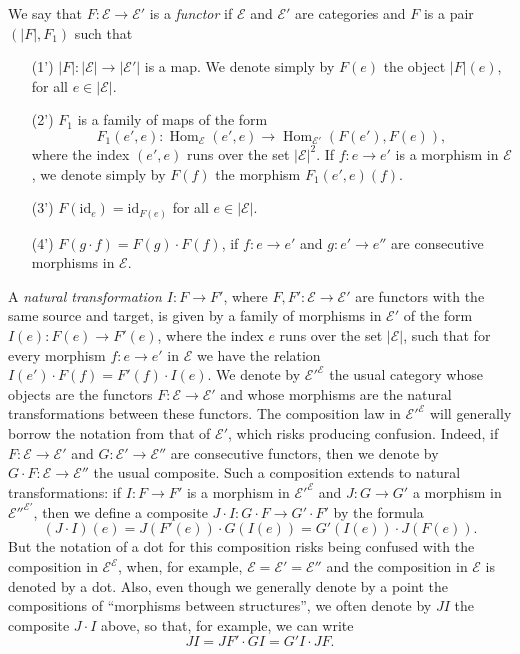 \documentclass{article}
\newcommand{\oldpage}[1]{\marginpar{\footnotesize$\Big\vert$ \textit{p.~#1}}}
\newcommand{\id}{\mathrm{id}}
\newcommand{\cat}[1]{\mathcal{#1}}
\newcommand{\set}[1]{|#1|}
\DeclareMathOperator{\Hom}{Hom}
\begin{document}
We say that $F\colon\cat{E}\to\cat{E}'$ is a \emph{functor} if $\cat{E}$ and $\cat{E}'$ are categories and $F$ is a pair $(\set{F},F_1)$ such that

\begin{enumerate}
  \item[(1')] $\set{F}\colon\set{\cat{E}}\to\set{\cat{E}'}$ is a map.
    We denote simply by $F(e)$ the object $\set{F}(e)$, for all $e\in\set{\cat{E}}$.

  \item[(2')] $F_1$ is a family of maps of the form
    \[
      F_1(e',e)\colon
      \Hom_\cat{E}(e',e)
      \to \Hom_{\cat{E}'}(F(e'),F(e)),
    \]
    where the index $(e',e)$ runs over the set $\set{\cat{E}}^2$.
    If $f\colon e\to e'$ is a morphism in $\cat{E}$, we denote simply by $F(f)$ the morphism $F_1(e',e)(f)$.

  \item[(3')] $F(\id_e)=\id_{F(e)}$ for all $e\in\set{\cat{E}}$.

  \item[(4')] $F(g\cdot f)=F(g)\cdot F(f)$, if $f\colon e\to e'$ and $g\colon e'\to e''$ are consecutive morphisms in $\cat{E}$.
\end{enumerate}

A \emph{natural transformation $I\colon F\to F'$}, where $F,F'\colon\cat{E}\to\cat{E}'$ are functors with the same source and target, is given by a family of morphisms in $\cat{E}'$ of the form $I(e)\colon F(e)\to F'(e)$, where the index $e$ runs over the set $\set{\cat{E}}$, such that for every morphism $f\colon e\to e'$ in $\cat{E}$ we have the relation $I(e')\cdot F(f)=F'(f)\cdot I(e)$.
\oldpage{221}
We denote by $\cat{E}'^{\cat{E}}$ the usual category whose objects are the functors $F\colon\cat{E}\to\cat{E}'$ and whose morphisms are the natural transformations between these functors.
The composition law in $\cat{E}'^{\cat{E}}$ will generally borrow the notation from that of $\cat{E}'$, which risks producing confusion.
Indeed, if $F\colon\cat{E}\to\cat{E}'$ and $G\colon\cat{E}'\to\cat{E}''$ are consecutive functors, then we denote by $G\cdot F\colon\cat{E}\to\cat{E}''$ the usual composite.
Such a composition extends to natural transformations: if $I\colon F\to F'$ is a morphism in $\cat{E}'^{\cat{E}}$ and $J\colon G\to G'$ a morphism in $\cat{E}''^{\cat{E}'}$, then we define a composite $J\cdot I\colon G\cdot F\to G'\cdot F'$ by the formula
\[
  (J\cdot I)(e)
  = J(F'(e))\cdot G(I(e))
  = G'(I(e))\cdot J(F(e)).
\]
But the notation of a dot for this composition risks being confused with the composition in $\cat{E}^\cat{E}$, when, for example, $\cat{E}=\cat{E}'=\cat{E}''$ and the composition in $\cat{E}$ is denoted by a dot.
Also, even though we generally denote by a point the compositions of ``morphisms between structures'', we often denote by $JI$ the composite $J\cdot I$ above, so that, for example, we can write
\[
  JI
  = JF'\cdot GI
  = G'I\cdot JF.
\]
\end{document}
